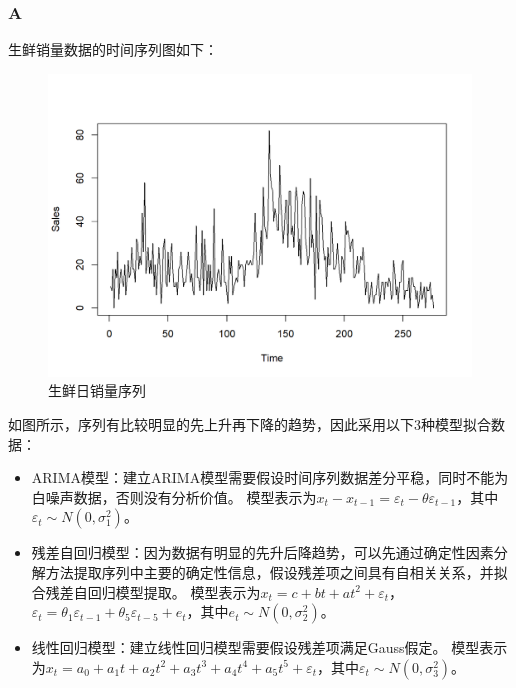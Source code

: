 \documentclass[12pt,a4paper]{article}
\begin{document}
    \title{}
    \date{}
    \author{姓名：\underline{刘哲}~~~~~~学号：\underline{2022103691}~~~~~~}
    \maketitle
    \section{}
    \vspace{10pt}
    \subsubsection*{A}
    生鲜销量数据的时间序列图如下：
    \begin{figure}[H]
        \centering
        \includegraphics[scale=0.8]{FreshTS.png}
        \caption{生鲜日销量序列}
    \end{figure}
    如图所示，序列有比较明显的先上升再下降的趋势，因此采用以下3种模型拟合数据：
    \begin{itemize}
        \item ARIMA模型：建立ARIMA模型需要假设时间序列数据差分平稳，同时不能为白噪声数据，否则没有分析价值。
        模型表示为$x_t-x_{t-1}=\varepsilon_t-\theta\varepsilon_{t-1}$，其中$\varepsilon_t\sim N(0,\sigma_1^2)$。
        \item 残差自回归模型：因为数据有明显的先升后降趋势，可以先通过确定性因素分解方法提取序列中主要的确定性信息，假设残差项之间具有自相关关系，并拟合残差自回归模型提取。
        模型表示为$x_t=c+bt+at^2+\varepsilon_t$，$\varepsilon_t=\theta_1\varepsilon_{t-1}+\theta_5\varepsilon_{t-5}+e_t$，其中$e_t\sim N(0,\sigma_2^2)$。
        \item 线性回归模型：建立线性回归模型需要假设残差项满足Gauss假定。
        模型表示为$x_t=a_0+a_1t+a_2t^2+a_3t^3+a_4t^4+a_5t^5+\varepsilon_t$，其中$\varepsilon_t\sim N(0,\sigma_3^2)$。
    \end{itemize}
\end{document}
